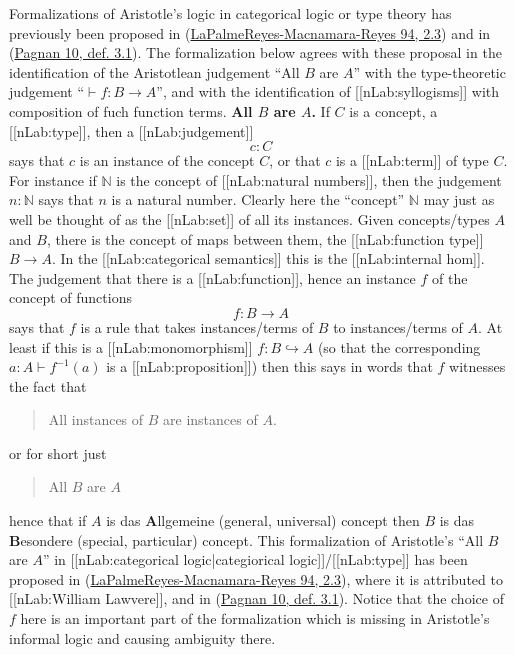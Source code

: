 \documentclass[12pt,titlepage]{article}
\theoremstyle{plain}
\theoremstyle{definition}
\theoremstyle{remark}
\begin{document}
Formalizations of Aristotle's logic in categorical logic or type theory has previously been proposed in (\hyperlink{PalmeReyesMacnamaraReyes94}{LaPalmeReyes-Macnamara-Reyes 94, 2.3}) and in (\hyperlink{Pagnan10}{Pagnan 10, def. 3.1}). The formalization below agrees with these proposal in the identification of the Aristotlean judgement ``All $B$ are $A$'' with the type-theoretic judgement ``$\vdash f \colon B\to A$'', and with the identification of [[nLab:syllogisms]] with composition of fuch function terms.
\textbf{All $B$ are $A$.}
If $C$ is a concept, a [[nLab:type]], then a [[nLab:judgement]]
\begin{displaymath}
c \colon C
\end{displaymath}
says that $c$ is an instance of the concept $C$, or that $c$ is a [[nLab:term]] of type $C$.
For instance if $\mathbb{N}$ is the concept of [[nLab:natural numbers]], then the judgement $n \colon \mathbb{N}$ says that $n$ is a natural number. Clearly here the ``concept'' $\mathbb{N}$ may just as well be thought of as the [[nLab:set]] of all its instances.
Given concepts/types $A$ and $B$, there is the concept of maps between them, the [[nLab:function type]] $B\to A$. In the [[nLab:categorical semantics]] this is the [[nLab:internal hom]].
The judgement that there is a [[nLab:function]], hence an instance $f$ of the concept of functions
\begin{displaymath}
f \colon B \longrightarrow A
\end{displaymath}
says that $f$ is a rule that takes instances/terms of $B$ to instances/terms of $A$. At least if this is a [[nLab:monomorphism]] $f \colon B \hookrightarrow A$ (so that the corresponding $a\colon A \vdash f^{-1}(a)$ is a [[nLab:proposition]]) then this says in words that $f$ witnesses the fact that
\begin{quote}%
All instances of $B$ are instances of $A$.
\end{quote}
or for short just
\begin{quote}%
All $B$ are $A$
\end{quote}
hence that if $A$ is das \textbf{A}llgemeine (general, universal) concept then $B$ is das \textbf{B}esondere (special, particular) concept.
This formalization of Aristotle's ``All $B$ are $A$'' in [[nLab:categorical logic|categiorical logic]]/[[nLab:type]] has been proposed in (\hyperlink{PalmeReyesMacnamaraReyes94}{LaPalmeReyes-Macnamara-Reyes 94, 2.3}), where it is attributed to [[nLab:William Lawvere]], and in (\hyperlink{Pagnan10}{Pagnan 10, def. 3.1}).
Notice that the choice of $f$ here is an important part of the formalization which is missing in Aristotle's informal logic and causing ambiguity there.
\end{document}
